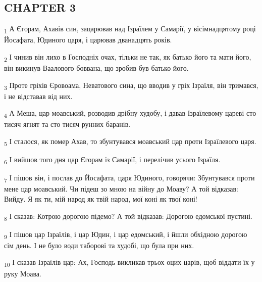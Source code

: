 \subsection{CHAPTER 3}
\begin{tcolorbox}
\textsubscript{1} А Єгорам, Ахавів син, зацарював над Ізраїлем у Самарії, у вісімнадцятому році Йосафата, Юдиного царя, і царював дванадцять років.
\end{tcolorbox}
\begin{tcolorbox}
\textsubscript{2} І чинив він лихо в Господніх очах, тільки не так, як батько його та мати його, він викинув Ваалового боввана, що зробив був батько його.
\end{tcolorbox}
\begin{tcolorbox}
\textsubscript{3} Проте гріхів Єровоама, Неватового сина, що вводив у гріх Ізраїля, він тримався, і не відставав від них.
\end{tcolorbox}
\begin{tcolorbox}
\textsubscript{4} А Меша, цар моавський, розводив дрібну худобу, і давав Ізраїлевому цареві сто тисяч ягнят та сто тисяч рунних баранів.
\end{tcolorbox}
\begin{tcolorbox}
\textsubscript{5} І сталося, як помер Ахав, то збунтувався моавський цар проти Ізраїлевого царя.
\end{tcolorbox}
\begin{tcolorbox}
\textsubscript{6} І вийшов того дня цар Єгорам із Самарії, і перелічив усього Ізраїля.
\end{tcolorbox}
\begin{tcolorbox}
\textsubscript{7} І пішов він, і послав до Йосафата, царя Юдиного, говорячи: Збунтувався проти мене цар моавський. Чи підеш зо мною на війну до Моаву? А той відказав: Вийду. Я як ти, мій народ як твій народ, мої коні як твої коні!
\end{tcolorbox}
\begin{tcolorbox}
\textsubscript{8} І сказав: Котрою дорогою підемо? А той відказав: Дорогою едомської пустині.
\end{tcolorbox}
\begin{tcolorbox}
\textsubscript{9} І пішов цар Ізраїлів, і цар Юдин, і цар едомський, і йшли обхідною дорогою сім день. І не було води таборові та худобі, що була при них.
\end{tcolorbox}
\begin{tcolorbox}
\textsubscript{10} І сказав Ізраїлів цар: Ах, Господь викликав трьох оцих царів, щоб віддати їх у руку Моава.
\end{tcolorbox}
